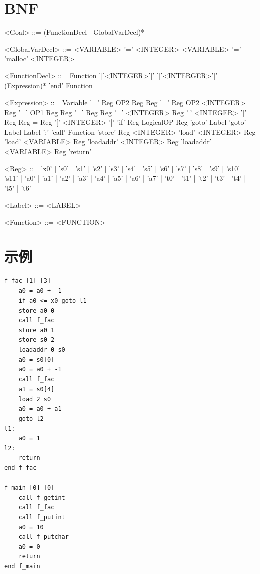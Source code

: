 \documentclass{ctexart}
\newenvironment{typewriterfont}{\ttfamily}{\par}
\begin{document}
\newpage
\section{BNF}
\setlength{\grammarindent}{8em} %
\begin{typewriterfont}
\begin{grammar}
<Goal>  ::= (FunctionDecl | GlobalVarDecl)*

<GlobalVarDecl> ::= <VARIABLE> '=' <INTEGER>
\alt <VARIABLE> '=' 'malloc' <INTEGER>

<FunctionDecl> ::= Function '['<INTEGER>']' '['<INTERGER>']' (Expression)* 'end' Function

<Expression>	::=	Variable '=' Reg OP2 Reg
\alt Reg '=' Reg OP2 <INTEGER>
\alt Reg '=' OP1 Reg
\alt Reg '=' Reg
\alt Reg '=' <INTEGER>
\alt Reg '[' <INTEGER> ']' = Reg
\alt Reg = Reg '[' <INTEGER> ']'
\alt 'if' Reg LogicalOP Reg 'goto' Label
\alt 'goto' Label
\alt Label ':'
\alt 'call' Function
\alt 'store' Reg <INTEGER>
\alt 'load' <INTEGER> Reg
\alt 'load' <VARIABLE> Reg
\alt 'loadaddr' <INTEGER> Reg
\alt 'loadaddr' <VARIABLE> Reg
\alt 'return'

<Reg> ::= 'x0'
| 's0'
| 's1'
| 's2'
| 's3'
| 's4'
| 's5'
| 's6'
| 's7'
| 's8'
| 's9'
| 's10'
| 's11'
| 'a0'
| 'a1'
| 'a2'
| 'a3'
| 'a4'
| 'a5'
| 'a6'
| 'a7'
| 't0'
| 't1'
| 't2'
| 't3'
| 't4'
| 't5'
| 't6'

<Label> ::= <LABEL>

<Function> ::= <FUNCTION>

\end{grammar}
\end{typewriterfont}

\newpage
\section{示例}
\begin{typewriterfont}
\begin{lstlisting}
f_fac [1] [3]
    a0 = a0 + -1
    if a0 <= x0 goto l1
    store a0 0
    call f_fac
    store a0 1
    store s0 2
    loadaddr 0 s0
    a0 = s0[0]
    a0 = a0 + -1
    call f_fac
    a1 = s0[4]
    load 2 s0
    a0 = a0 + a1
    goto l2
l1:
    a0 = 1
l2:
    return
end f_fac

f_main [0] [0]
    call f_getint
    call f_fac
    call f_putint
    a0 = 10
    call f_putchar
    a0 = 0
    return
end f_main
\end{lstlisting}
\end{typewriterfont}
\end{document}
